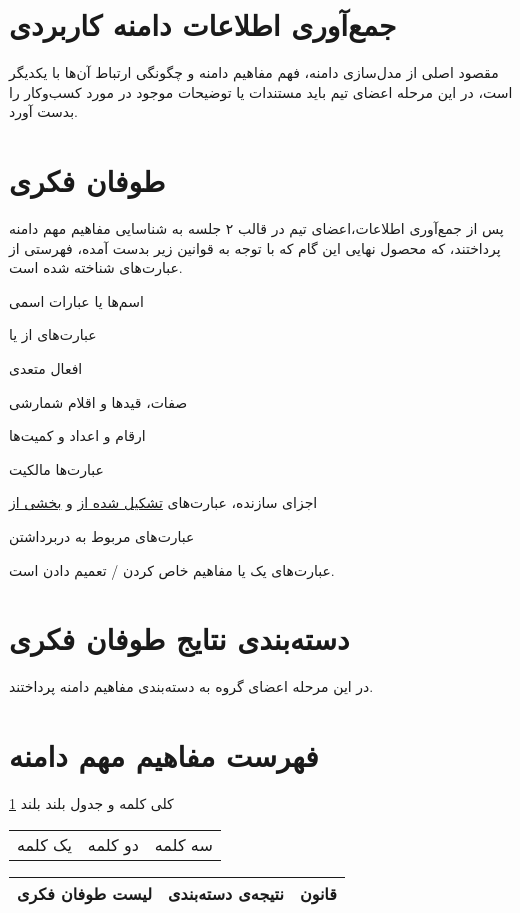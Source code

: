\documentclass[12pt,svgnames,oneside]{book}
\newcounter{itemadded}
\let\LaTeXStandardEnumerateBegin\enumerate
\let\LaTeXStandardEnumerateEnd\endenumerate
\renewenvironment{enumerate}{%
	\LaTeXStandardEnumerateBegin%
	\setcounter{itemadded}{0}
}{%
	\LaTeXStandardEnumerateEnd%
}%
\begin{document}
		\section{جمع‌آوری اطلاعات دامنه کاربردی}	
			مقصود اصلی از مدل‌سازی دامنه، فهم مفاهیم دامنه و چگونگی ارتباط آن‌ها با یکدیگر است، در این مرحله اعضای تیم باید مستندات یا توضیحات موجود در مورد کسب‌و‌کار را بدست آورد.
		\section{طوفان فکری}
			پس از جمع‌آوری اطلاعات،‌اعضای تیم در قالب ۲ جلسه به شناسایی مفاهیم مهم دامنه پرداختند، که محصول نهایی این گام که با توجه به قوانین زیر بدست آمده، فهرستی از عبارت‌های شناخته شده است.
			\begin{enumerate}
				\item اسم‌‌ها یا عبارات اسمی
				\item عبارت‌های  از 
				یا
				\item افعال متعدی
			    \item صفات، قید‌‌ها و اقلام شمارشی
				\item ارقام و اعداد و کمیت‌ها
				\item عبارت‌ها مالکیت
				\item اجزای سازنده، عبارت‌های \underline{تشکیل شده از} و \underline{بخشی از}
				\item عبارت‌های مربوط به دربرداشتن
				\item عبارت‌های  
				یک  یا مفاهیم خاص کردن / تعمیم دادن است.
			\end{enumerate}
		
		\section{دسته‌بندی نتایج طوفان فکری}
			در این مرحله اعضای گروه به دسته‌بندی مفاهیم دامنه پرداختند.
			
		\section{فهرست مفاهیم مهم دامنه}
			کلی کلمه و جدول بلند بلند \ref{table:domain}
			
			\begin{longtable}{ccc}
				یک کلمه
				\footnotemark[2] &
				دو کلمه
				\footnotemark[10]&
				سه کلمه 
				\footnotemark \\
			\end{longtable}
		
			\begin{table}[H]
				\caption{مفاهیم مهم دامنه}
				\begin{longtable}{|c|c|c|}
					\hline
					لیست طوفان فکری &
					نتیجه‌ی دسته‌بندی &
					قانون \\
					\hline
				\end{longtable}
				\label{table:domain}
			\end{table}
\end{document}
